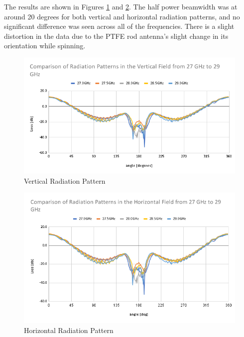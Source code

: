 \documentclass[a4paper,12pt]{report}
\begin{document}
The results are shown in Figures
\ref{fig:radiation_pattern_comparison_27_29_vertical}
and \ref{img:radiation_pattern_comparison_27_29_horizontal}.
The half power beamwidth was at around 20 degrees for both
vertical and horizontal radiation patterns,
and no significant difference was seen across all of the frequencies.
There is a slight distortion in the data due to
the PTFE rod antenna's slight change in its orientation
while spinning.


\begin{figure}
  \begin{center}
    \includegraphics[clip, keepaspectratio, width=0.9\linewidth]{img/radiation_pattern_comparison_27_29_vertical.png}
    \caption{Vertical Radiation Pattern}
    \label{fig:radiation_pattern_comparison_27_29_vertical} 
  \end{center}
\end{figure}

\begin{figure}
  \begin{center}
    \includegraphics[clip, keepaspectratio, width=0.9\linewidth]{img/radiation_pattern_comparison_27_29_horizontal.png}
    \caption{Horizontal Radiation Pattern}
    \label{img:radiation_pattern_comparison_27_29_horizontal}
  \end{center}
\end{figure}
\end{document}
